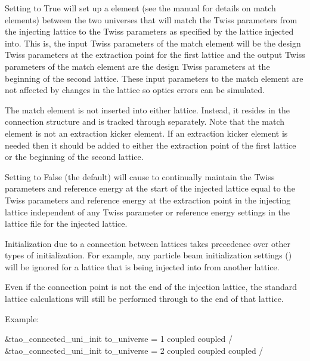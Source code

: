 {{{{{{{{{{{{Setting  to True will set up a  element
(see the \bmad manual for details on match elements) between the two
universes that will match the  Twiss parameters from the
injecting lattice to the  Twiss parameters as specified by
the lattice injected into. This is, the input Twiss parameters of the
match element will be the design Twiss parameters at the extraction
point for the first lattice and the output Twiss parameters of the
match element are the design Twiss parameters at the beginning of the
second lattice. These input parameters to the match element are not
affected by changes in the  lattice so optics errors can be
simulated.

The match element is not inserted into either lattice. Instead, it
resides in the \tao connection structure and is tracked through
separately. Note that the match element is not an extraction kicker
element. If an extraction kicker element is needed then it should be
added to either the extraction point of the first lattice or the
beginning of the second lattice.

Setting  to False (the default) will cause \tao to
continually maintain the  Twiss parameters and reference
energy at the start of the injected lattice equal to the 
Twiss parameters and reference energy at the extraction point in the
injecting lattice independent of any Twiss parameter or reference
energy settings in the lattice file for the injected lattice.

Initialization due to a connection between lattices takes precedence
over other types of initialization. For example, any particle beam
initialization settings () will be ignored for a
lattice that is being injected into from another lattice.

Even if the connection point is not the end of the injection lattice,
the standard lattice calculations will still be performed through to
the end of that lattice.

Example:
\begin{example}
  &tao_connected_uni_init
    to_universe = 1
    coupled%
    coupled%
  /
  &tao_connected_uni_init
    to_universe = 2
    coupled%
    coupled%
    coupled%
  /
\end{example}

}}}}}}}}}}}}
